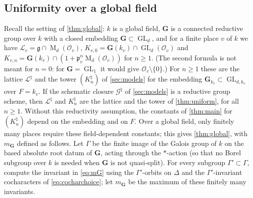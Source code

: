 \documentclass[11pt,reqno]{amsart}
\numberwithin{equation}{section}
\theoremstyle{plain}
\theoremstyle{definition}
\theoremstyle{remark}
\theoremstyle{plain}
\newcommand{\OO}{\mathcal{O}}    %
\newcommand{\pp}{\mathfrak{p}}   %
\newcommand{\Lat}{\mathcal{L}}   %
\newcommand{\bG}{\mathbf{G}}     %
\newcommand{\g}{\mathfrak{g}}    %
\newcommand{\cG}{\mathcal{G}}                   %
\DeclareMathOperator{\GL}{GL}
\DeclareMathOperator{\Mat}{M}
\begin{document}
\subsection{Uniformity over a global field}\label{sec:global}
Recall the setting of \cref{thm:global}: $k$ is a global field, $\bG$ is a
connected reductive group over $k$ with a closed embedding $\bG\subset\GL_d$,
and for a finite place $v$ of $k$ we have $\Lat_v=\g\cap\Mat_d(\OO_v)$,
$K_{v,0}=\bG(k_v)\cap\GL_d(\OO_v)$ and
$K_{v,n}=\bG(k_v)\cap(1+\pp_v^n\Mat_d(\OO_v))$ for $n\ge1$. (The second
formula is not meant for $n=0$: for $\bG=\GL_1$ it would give
$\OO_v\setminus\{0\}$.) For $n\ge1$ these are the lattice
$\Lat^\natural$ and the tower $(K^\natural_n)$ of \cref{sec:models} for the
embedding $\bG_{k_v}\subset\GL_{d,k_v}$ over $F=k_v$.
If the schematic closure $\cG^\natural$ of \cref{sec:models} is a
reductive group scheme, then $\Lat^\natural$ and $K_n^\natural$ are the
lattice and the tower of \cref{thm:uniform}, for all $n\ge1$. Without this reductivity assumption, the constants of
\cref{thm:main} for $(K^\natural_n)$ depend on the embedding and on $F$.
Over a global field, only finitely many places require these
field-dependent constants; this gives \cref{thm:global}, with $m_{\bG}$ defined as follows. Let $\Gamma$ be
the finite image of the Galois group of $k$ on the based absolute root
datum of $\bG$, acting through the $*$-action (so that no Borel subgroup
over $k$ is needed when $\bG$ is not quasi-split). For every
subgroup $\Gamma'\subset\Gamma$, compute the invariant in \eqref{eq:mG} using
the $\Gamma'$-orbits on $\Delta$ and the $\Gamma'$-invariant cocharacters of
\eqref{eq:cocharchoice}; let $m_{\bG}$ be the maximum of these finitely many
invariants.
\end{document}
